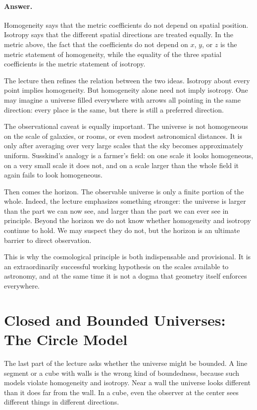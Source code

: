 \paragraph{Answer.} Homogeneity says that the metric coefficients do not depend on spatial position. Isotropy says that the different spatial directions are treated equally. In the metric above, the fact that the coefficients do not depend on \(x\), \(y\), or \(z\) is the metric statement of homogeneity, while the equality of the three spatial coefficients is the metric statement of isotropy.

The lecture then refines the relation between the two ideas. Isotropy about every point implies homogeneity. But homogeneity alone need not imply isotropy. One may imagine a universe filled everywhere with arrows all pointing in the same direction: every place is the same, but there is still a preferred direction.

The observational caveat is equally important. The universe is not homogeneous on the scale of galaxies, or rooms, or even modest astronomical distances. It is only after averaging over very large scales that the sky becomes approximately uniform. Susskind's analogy is a farmer's field: on one scale it looks homogeneous, on a very small scale it does not, and on a scale larger than the whole field it again fails to look homogeneous.

Then comes the horizon. The observable universe is only a finite portion of the whole. Indeed, the lecture emphasizes something stronger: the universe is larger than the part we can now see, and larger than the part we can ever see in principle. Beyond the horizon we do not know whether homogeneity and isotropy continue to hold. We may suspect they do not, but the horizon is an ultimate barrier to direct observation.

This is why the cosmological principle is both indispensable and provisional. It is an extraordinarily successful working hypothesis on the scales available to astronomy, and at the same time it is not a dogma that geometry itself enforces everywhere.

\section{Closed and Bounded Universes: The Circle Model}

The last part of the lecture asks whether the universe might be bounded. A line segment or a cube with walls is the wrong kind of boundedness, because such models violate homogeneity and isotropy. Near a wall the universe looks different than it does far from the wall. In a cube, even the observer at the center sees different things in different directions.

